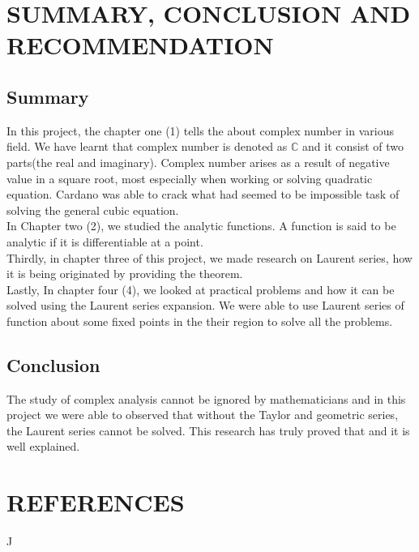\documentclass[12pt]{report}
\newcommand{\NI}{\noindent}
\newcommand{\complex}{\mathbb{C}}
\begin{document}
	
	\chapter{SUMMARY, CONCLUSION AND RECOMMENDATION}
	\section{Summary}
	In this project, the chapter one (1) tells the about complex number in various field. We have learnt that complex number is denoted as $\complex$ and it consist of two parts(the real and imaginary). Complex number arises as a result of negative value in a square root, most especially when working or solving quadratic equation. Cardano was able to crack what had seemed to be impossible task of solving the general cubic equation.\\
	
	\NI In Chapter two (2), we studied the analytic functions. A function is said to be analytic if it is differentiable at a point.\\
	
	\NI Thirdly, in chapter three of this project, we made research on Laurent series, how it is being originated by providing the theorem.\\
	
	\NI Lastly, In chapter four (4), we looked at practical problems and how it can be solved using the Laurent series expansion. We were able to use Laurent series of function about some fixed points in the their region to solve all the problems.
	\section{Conclusion}
	The study of complex analysis cannot be ignored by mathematicians and in this project we were able to observed that without the Taylor and geometric series, the Laurent series cannot be solved. This research has truly proved that and it is well explained.
	

	
	\chapter*{REFERENCES}
	
	\begin{description}
		\item J
		
	\end{description}
	
\end{document}
